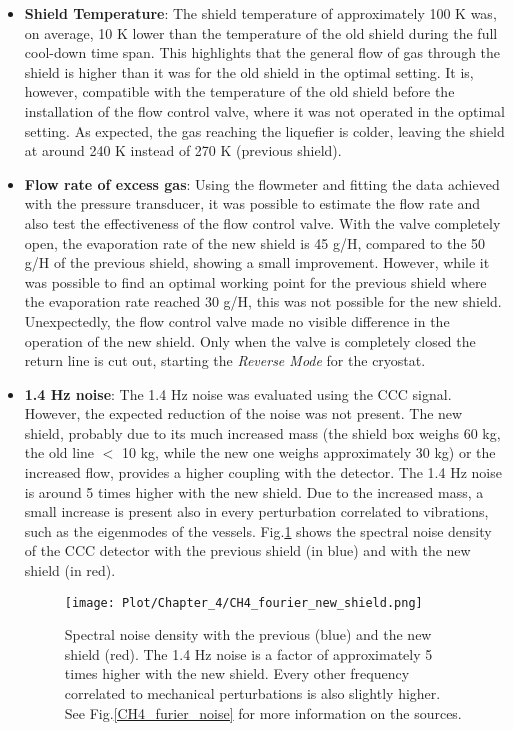 \documentclass[12pt,a4paper]{report}
\begin{document}
        \begin{itemize}
        	\item \textbf{Shield Temperature}: The shield temperature of approximately 100 K was, on average, 10 K lower than the temperature of the old shield during the full cool-down time span. This highlights that the general flow of gas through the shield is higher than it was for the old shield in the optimal setting. It is, however, compatible with the temperature of the old shield before the installation of the flow control valve, where it was not operated in the optimal setting. As expected, the gas reaching the liquefier is colder, leaving the shield at around 240 K instead of 270 K (previous shield).
        	\item \textbf{Flow rate of excess gas}: Using the flowmeter and fitting the data achieved with the pressure transducer, it was possible to estimate the flow rate and also test the effectiveness of the flow control valve. With the valve completely open, the evaporation rate of the new shield is 45 g/H, compared to the 50 g/H of the previous shield, showing a small improvement. However, while it was possible to find an optimal working point for the previous shield where the evaporation rate reached 30 g/H, this was not possible for the new shield. Unexpectedly, the flow control valve made no visible difference in the operation of the new shield. Only when the valve is completely closed the return line is cut out, starting the \textit{Reverse Mode} for the cryostat.
        	\item \textbf{1.4 Hz noise}: The 1.4 Hz noise was evaluated using the CCC signal. However, the expected reduction of the noise was not present. The new shield, probably due to its much increased mass (the shield box weighs 60 kg, the old line $<$ 10 kg, while the new one weighs approximately 30 kg) or the increased flow, provides a higher coupling with the detector. The 1.4 Hz noise is around 5 times higher with the new shield. Due to the increased mass, a small increase is present also in every perturbation correlated to vibrations, such as the eigenmodes of the vessels. Fig.\ref{CH4_fourier_new_shield} shows the spectral noise density of the CCC detector with the previous shield (in blue) and with the new shield (in red).
        	\begin{figure}[H]
        		\centering
        		\texttt{[image: Plot/Chapter\_4/CH4\_fourier\_new\_shield.png]}
        		\caption{\small{Spectral noise density with the previous (blue) and the new shield (red). The 1.4 Hz noise is a factor of approximately 5 times higher with the new shield. Every other frequency correlated to mechanical perturbations is also slightly higher. See Fig.\ref{CH4_furier_noise} for more information on the sources.}}
        		\label{CH4_fourier_new_shield}
        	\end{figure}
        \end{itemize}
\end{document}
